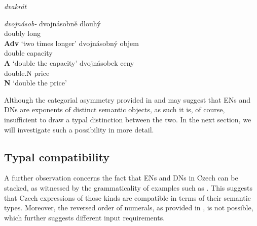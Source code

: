 \documentclass[output=paper,modfonts,hidelinks,newtxmath
\ChapterDOI{10.5281/zenodo.2545513}
]{langscibook}
\begin{document}
\begin{multicols}{2}
\ea \textit{dvakrát}\label{dvakrat-morphology}

\z
\z
\columnbreak
%
\ea \textit{dvojnásob-}\label{dvojnasobne-morphology} 
\ea \gll dvojnásobně dlouhý\\
doubly long\\\hfill\textbf{Adv}
\glt `two times longer'
\ex \gll dvojnásobný objem\\
double capacity\\\hfill\textbf{A}
\glt `double the capacity'
\ex \gll dvojnásobek ceny\\
double.N price\\\hfill\textbf{N}
\glt `double the price'
\z \z

\end{multicols}
\vspace{3mm}

\noindent Although the categorial asymmetry provided in  and  may suggest that ENs and DNs are exponents of distinct semantic objects, as such it is, of course, insufficient to draw a typal distinction between the two. In the next section, we will investigate such a possibility in more detail.

\subsection{Typal compatibility}\label{typal-compatibility}

A further observation concerns the fact that ENs and DNs in Czech can be stacked, as witnessed by the grammaticality of examples such as . This suggests that Czech expressions of those kinds are compatible in terms of their semantic types. Moreover, the reversed order of numerals, as provided in , is not possible, which further suggests different input requirements.
\end{document}
